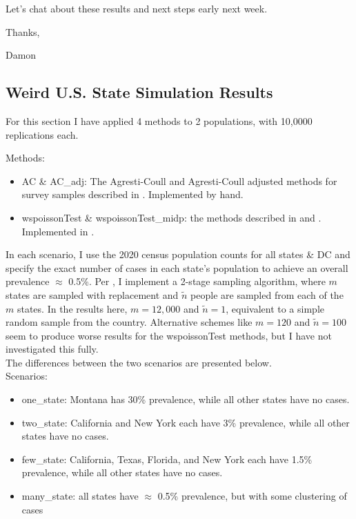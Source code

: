 \documentclass{article}
\begin{document}
Let’s chat about these results and next steps early next week.

Thanks,

Damon



\subsection{Weird U.S. State Simulation Results}

For this section I have applied 4 methods to 2 populations, with 10,0000 replications each.

\noindent Methods:
\begin{itemize}
    \item AC \& AC\_adj: The Agresti-Coull and Agresti-Coull adjusted methods for survey samples described in \cite{Dean:2015}. Implemented by hand.
    \item wspoissonTest \& wspoissonTest\_midp: the methods described in \cite{FayF:1997} and \cite{FayK:2017}. Implemented in \cite{asht}.
\end{itemize}

In each scenario, I use the 2020 census population counts for all states \& DC and specify the exact number of cases in each state's population to achieve an overall prevalence $\approx$  0.5\%.
Per \cite{Lemeshow1985SurveysTM}, I implement a 2-stage sampling algorithm, where $m$ states are sampled with replacement and $\tilde{n}$ people are sampled from each of the $m$ states.
In the results here, $m = 12,000$ and $\tilde{n} = 1$, equivalent to a simple random sample from the country.
Alternative schemes like $m = 120$ and $\tilde{n} = 100$ seem to produce worse results for the wspoissonTest methods, but I have not investigated this fully.\\
The differences between the two scenarios are presented below.\\

\noindent Scenarios:
\begin{itemize}
    \item one\_state: Montana has 30\% prevalence, while all other states have no cases.
    \item two\_state: California and New York each have 3\% prevalence, while all other states have no cases.
    \item few\_state: California, Texas, Florida, and New York each have 1.5\% prevalence, while all other states have no cases.
    \item many\_state: all states have $\approx$ 0.5\% prevalence, but with some clustering of cases
\end{itemize}
\end{document}
